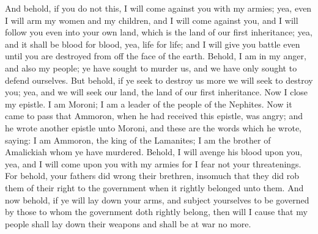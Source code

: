 And behold, if you do not this, I will come against you with my armies; yea, even I will arm my women and my children, and I will come against you, and I will follow you even into your own land, which is the land of our first inheritance; yea, and it shall be blood for blood, yea, life for life; and I will give you battle even until you are destroyed from off the face of the earth.
\bverse \iffalse Behold, I am in my anger, and also my people; ye have sought to murder us, and we have only sought to defend ourselves. But behold, if ye seek to destroy us more we will seek to destroy you; yea, and we will seek our land, the land of our first inheritance. \fi
Behold, I am in my anger, and also my people; ye have sought to murder us, and we have only sought to defend ourselves. But behold, if ye seek to destroy us more we will seek to destroy you; yea, and we will seek our land, the land of our first inheritance.
\bverse \iffalse Now I close my epistle. I am Moroni; I am a leader of the people of the Nephites. \fi
Now I close my epistle. I am Moroni; I am a leader of the people of the Nephites.
\bverse \iffalse Now it came to pass that Ammoron, when he had received this epistle, was angry; and he wrote another epistle unto Moroni, and these are the words which he wrote, saying: \fi
Now it came to pass that Ammoron, when he had received this epistle, was angry; and he wrote another epistle unto Moroni, and these are the words which he wrote, saying:
\bverse \iffalse I am Ammoron, the king of the Lamanites; I am the brother of Amalickiah whom ye have murdered. Behold, I will avenge his blood upon you, yea, and I will come upon you with my armies for I fear not your threatenings. \fi
I am Ammoron, the king of the Lamanites; I am the brother of Amalickiah whom ye have murdered. Behold, I will avenge his blood upon you, yea, and I will come upon you with my armies for I fear not your threatenings.
\bverse \iffalse For behold, your fathers did wrong their brethren, insomuch that they did rob them of their right to the government when it rightly belonged unto them. \fi
For behold, your fathers did wrong their brethren, insomuch that they did rob them of their right to the government when it rightly belonged unto them.
\bverse \iffalse And now behold, if ye will lay down your arms, and subject yourselves to be governed by those to whom the government doth rightly belong, then will I cause that my people shall lay down their weapons and shall be at war no more. \fi
And now behold, if ye will lay down your arms, and subject yourselves to be governed by those to whom the government doth rightly belong, then will I cause that my people shall lay down their weapons and shall be at war no more.

